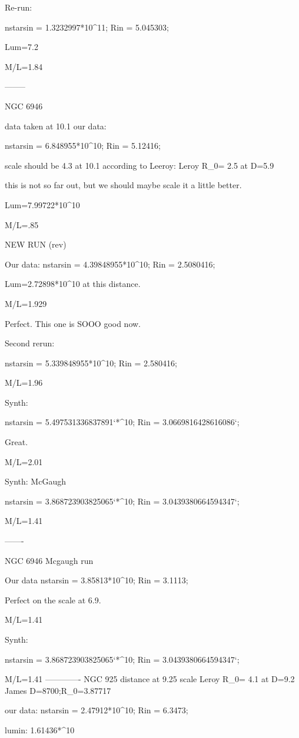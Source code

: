 Re-run:

nstarsin = 1.3232997*10^11;
Rin = 5.045303;

Lum=7.2

M/L=1.84



--------


NGC 6946

data taken at 10.1
our data:

nstarsin = 6.848955*10^10;
Rin = 5.12416;

scale should be 4.3 at 10.1 according to Leeroy:  Leroy R_0= 2.5 at D=5.9

this is not so far out, but we should maybe scale it a little better.

Lum=7.99722*10^10

M/L=.85

NEW RUN (rev)

Our data:
nstarsin = 4.39848955*10^10;
Rin = 2.5080416;

Lum=2.72898*10^10 at this distance.

M/L=1.929

Perfect.  This one is SOOO good now.

Second rerun:

nstarsin = 5.339848955*10^10;
Rin = 2.580416;

M/L=1.96

Synth:

nstarsin = 5.497531336837891`*^10;
Rin = 3.0669816428616086`;

Great.

M/L=2.01


Synth: McGaugh

nstarsin = 3.868723903825065`*^10;
Rin = 3.0439380664594347`;

M/L=1.41

-------

NGC  6946 Mcgaugh run

Our data
nstarsin = 3.85813*10^10;
Rin = 3.1113;

Perfect on the scale at 6.9.

M/L=1.41

Synth:

nstarsin = 3.868723903825065`*^10;
Rin = 3.0439380664594347`;

M/L=1.41
-------------
NGC 925
distance at 9.25
scale Leroy R_0= 4.1 at D=9.2
James D=8700;R_0=3.87717

our data:
nstarsin = 2.47912*10^10;
Rin = 6.3473;

lumin: 1.61436*^10

